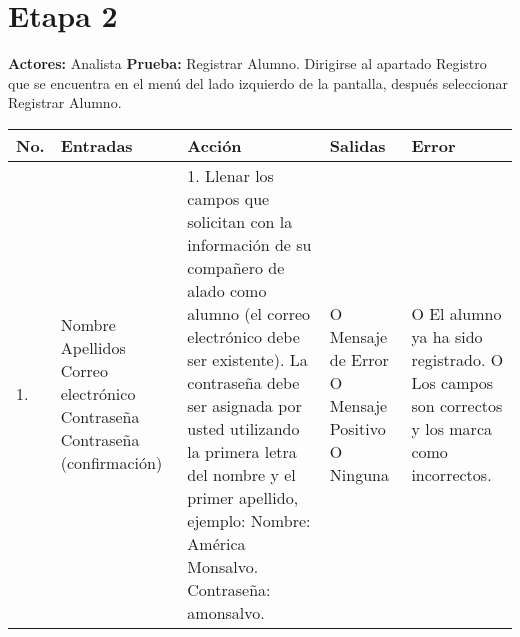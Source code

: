 \section*{Etapa 2}
\textbf{Actores:} Analista\newline
\textbf{Prueba:} Registrar Alumno.\newline
Dirigirse al apartado Registro que se encuentra en el menú del lado izquierdo de la pantalla, después seleccionar Registrar Alumno.
\begin{longtable}{|p{0.7cm}|p{3cm}|p{6cm}|p{2.3cm}|p{3cm}|}
    \hline	
	\textbf{No.}
	&
	\textbf{Entradas}	
	&
	\textbf{Acción}
	&
	\textbf{Salidas}
	&
	\textbf{Error}
	\\
	\hline
	1.
	&
	Nombre\newline
	Apellidos\newline
	Correo electrónico\newline
	Contraseña\newline
	Contraseña (confirmación)	
	&
	1. Llenar los campos que solicitan con la información de su compañero de alado como alumno (el correo electrónico debe ser existente). La contraseña debe ser asignada por usted utilizando la primera letra del nombre y el primer apellido, ejemplo:\newline
	Nombre: América Monsalvo.\newline
	Contraseña: amonsalvo.	 	
	&
	O Mensaje de Error\newline
 	O Mensaje Positivo\newline
 	O Ninguna	 	
 	&
 	O El alumno ya ha sido registrado.\newline
 	O Los campos son correctos y los marca como incorrectos.\\
 	\hline
\end{longtable}
